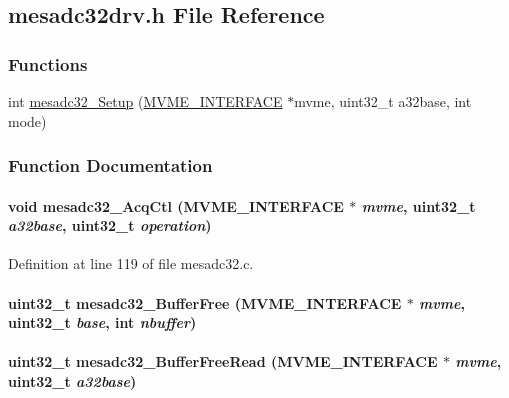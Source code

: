 \subsection{mesadc32drv.h File Reference}
\label{mesadc32drv_8h}
\subsubsection*{Functions}
\begin{DoxyCompactItemize}
\item 
int \hyperlink{mesadc32drv_8h_a95eb66d4984998966acc70b1424f632f}{mesadc32\_\-Setup} (\hyperlink{structMVME__INTERFACE}{MVME\_\-INTERFACE} $\ast$mvme, uint32\_\-t a32base, int mode)
\end{DoxyCompactItemize}


\subsubsection{Function Documentation}
\paragraph[{mesadc32\_\-AcqCtl}]{\setlength{\rightskip}{0pt plus 5cm}void mesadc32\_\-AcqCtl ({\bf MVME\_\-INTERFACE} $\ast$ {\em mvme}, \/  uint32\_\-t {\em a32base}, \/  uint32\_\-t {\em operation})}\hfill\label{mesadc32drv_8h_a618aa6c4626c5545323107306b9b3b79}


Definition at line 119 of file mesadc32.c.
\paragraph[{mesadc32\_\-BufferFree}]{\setlength{\rightskip}{0pt plus 5cm}uint32\_\-t mesadc32\_\-BufferFree ({\bf MVME\_\-INTERFACE} $\ast$ {\em mvme}, \/  uint32\_\-t {\em base}, \/  int {\em nbuffer})}\hfill\label{mesadc32drv_8h_a33e8a5689c00d7f519afc0eee5952f6c}
\paragraph[{mesadc32\_\-BufferFreeRead}]{\setlength{\rightskip}{0pt plus 5cm}uint32\_\-t mesadc32\_\-BufferFreeRead ({\bf MVME\_\-INTERFACE} $\ast$ {\em mvme}, \/  uint32\_\-t {\em a32base})}\hfill\label{mesadc32drv_8h_af9e804d15d10824867aea986f3fd2250}
